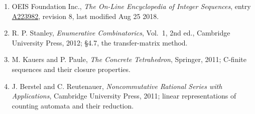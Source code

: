 \documentclass[11pt]{article}
\theoremstyle{definition}
\begin{document}
\begin{enumerate}

\item OEIS Foundation Inc., \emph{The On-Line Encyclopedia of Integer Sequences}, entry \href{https://oeis.org/A223982}{A223982}, revision 8, last modified Aug 25 2018.

\item R. P. Stanley, \emph{Enumerative Combinatorics}, Vol.~1, 2nd ed., Cambridge University Press, 2012; \S4.7, the transfer-matrix method.

\item M. Kauers and P. Paule, \emph{The Concrete Tetrahedron}, Springer, 2011; C-finite sequences and their closure properties.

\item J. Berstel and C. Reutenauer, \emph{Noncommutative Rational Series with Applications}, Cambridge University Press, 2011; linear representations of counting automata and their reduction.

\end{enumerate}
\end{document}
